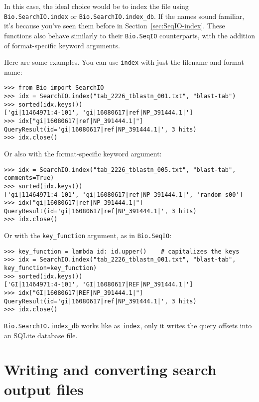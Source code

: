 In this case, the ideal choice would be to index the file using
\verb|Bio.SearchIO.index| or \verb|Bio.SearchIO.index_db|. If the names sound
familiar, it's because you've seen them before in  Section~\ref{sec:SeqIO-index}.
These functions also behave similarly to their \verb|Bio.SeqIO| counterparts,
with the addition of format-specific keyword arguments.

Here are some examples. You can use \verb|index| with just the filename and
format name:

\begin{verbatim}
>>> from Bio import SearchIO
>>> idx = SearchIO.index("tab_2226_tblastn_001.txt", "blast-tab")
>>> sorted(idx.keys())
['gi|11464971:4-101', 'gi|16080617|ref|NP_391444.1|']
>>> idx["gi|16080617|ref|NP_391444.1|"]
QueryResult(id='gi|16080617|ref|NP_391444.1|', 3 hits)
>>> idx.close()
\end{verbatim}

Or also with the format-specific keyword argument:

\begin{verbatim}
>>> idx = SearchIO.index("tab_2226_tblastn_005.txt", "blast-tab", comments=True)
>>> sorted(idx.keys())
['gi|11464971:4-101', 'gi|16080617|ref|NP_391444.1|', 'random_s00']
>>> idx["gi|16080617|ref|NP_391444.1|"]
QueryResult(id='gi|16080617|ref|NP_391444.1|', 3 hits)
>>> idx.close()
\end{verbatim}

Or with the \verb|key_function| argument, as in \verb|Bio.SeqIO|:

\begin{verbatim}
>>> key_function = lambda id: id.upper()    # capitalizes the keys
>>> idx = SearchIO.index("tab_2226_tblastn_001.txt", "blast-tab", key_function=key_function)
>>> sorted(idx.keys())
['GI|11464971:4-101', 'GI|16080617|REF|NP_391444.1|']
>>> idx["GI|16080617|REF|NP_391444.1|"]
QueryResult(id='gi|16080617|ref|NP_391444.1|', 3 hits)
>>> idx.close()
\end{verbatim}

\verb|Bio.SearchIO.index_db| works like as \verb|index|, only it writes the
query offsets into an SQLite database file.

\section{Writing and converting search output files}
\label{sec:searchio-write}


